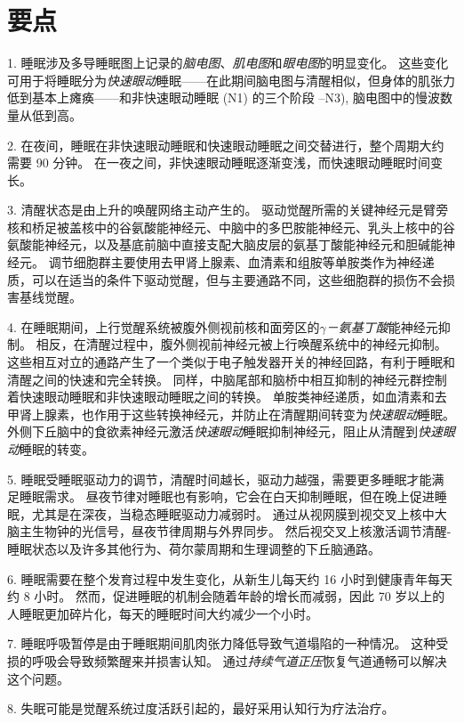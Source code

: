 \section{要点}

1. 睡眠涉及多导睡眠图上记录的\textit{脑电图}、\textit{肌电图}和\textit{眼电图}的明显变化。
这些变化可用于将睡眠分为\textit{快速眼动}睡眠——在此期间脑电图与清醒相似，但身体的肌张力低到基本上瘫痪——和非快速眼动睡眠 (N1) 的三个阶段 –N3), 脑电图中的慢波数量从低到高。 


2. 在夜间，睡眠在非快速眼动睡眠和快速眼动睡眠之间交替进行，整个周期大约需要 90 分钟。
在一夜之间，非快速眼动睡眠逐渐变浅，而快速眼动睡眠时间变长。


3. 清醒状态是由上升的唤醒网络主动产生的。
驱动觉醒所需的关键神经元是臂旁核和桥足被盖核中的谷氨酸能神经元、中脑中的多巴胺能神经元、乳头上核中的谷氨酸能神经元，以及基底前脑中直接支配大脑皮层的氨基丁酸能神经元和胆碱能神经元。
调节细胞群主要使用去甲肾上腺素、血清素和组胺等单胺类作为神经递质，可以在适当的条件下驱动觉醒，但与主要通路不同，这些细胞群的损伤不会损害基线觉醒。 


4. 在睡眠期间，上行觉醒系统被腹外侧视前核和面旁区的\textit{$\gamma$－氨基丁酸}能神经元抑制。
相反，在清醒过程中，腹外侧视前神经元被上行唤醒系统中的神经元抑制。
这些相互对立的通路产生了一个类似于电子触发器开关的神经回路，有利于睡眠和清醒之间的快速和完全转换。
同样，中脑尾部和脑桥中相互抑制的神经元群控制着快速眼动睡眠和非快速眼动睡眠之间的转换。
单胺类神经递质，如血清素和去甲肾上腺素，也作用于这些转换神经元，并防止在清醒期间转变为\textit{快速眼动}睡眠。
外侧下丘脑中的食欲素神经元激活\textit{快速眼动}睡眠抑制神经元，阻止从清醒到\textit{快速眼动}睡眠的转变。


5. 睡眠受睡眠驱动力的调节，清醒时间越长，驱动力越强，需要更多睡眠才能满足睡眠需求。
昼夜节律对睡眠也有影响，它会在白天抑制睡眠，但在晚上促进睡眠，尤其是在深夜，当稳态睡眠驱动力减弱时。
通过从视网膜到视交叉上核中大脑主生物钟的光信号，昼夜节律周期与外界同步。
然后视交叉上核激活调节清醒-睡眠状态以及许多其他行为、荷尔蒙周期和生理调整的下丘脑通路。


6. 睡眠需要在整个发育过程中发生变化，从新生儿每天约 16 小时到健康青年每天约 8 小时。
然而，促进睡眠的机制会随着年龄的增长而减弱，因此 70 岁以上的人睡眠更加碎片化，每天的睡眠时间大约减少一个小时。


7. 睡眠呼吸暂停是由于睡眠期间肌肉张力降低导致气道塌陷的一种情况。
这种受损的呼吸会导致频繁醒来并损害认知。
通过\textit{持续气道正压}恢复气道通畅可以解决这个问题。


8. 失眠可能是觉醒系统过度活跃引起的，最好采用认知行为疗法治疗。


